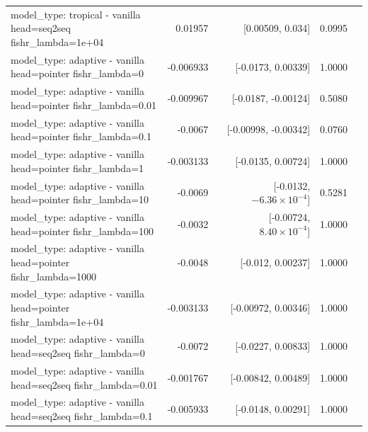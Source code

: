 \documentclass[10pt]{article}
\makeatletter
\newcommand{\stackcell}[1]{\begin{tabular}[t]{@{}l@{}}#1\end{tabular}}
\makeatother
\begin{document}
{\begin{longtable}{lrrrl}
\stackcell{model\_type: tropical - vanilla\\\footnotesize head=seq2seq fishr\_lambda=1e+04 } & 0.01957 & [0.00509, 0.034] & 0.0995 & \\
\stackcell{model\_type: adaptive - vanilla\\\footnotesize head=pointer fishr\_lambda=0 } & -0.006933 & [-0.0173, 0.00339] & 1.0000 & \\
\stackcell{model\_type: adaptive - vanilla\\\footnotesize head=pointer fishr\_lambda=0.01 } & -0.009967 & [-0.0187, -0.00124] & 0.5080 & \\
\stackcell{model\_type: adaptive - vanilla\\\footnotesize head=pointer fishr\_lambda=0.1 } & -0.0067 & [-0.00998, -0.00342] & 0.0760 & \\
\stackcell{model\_type: adaptive - vanilla\\\footnotesize head=pointer fishr\_lambda=1 } & -0.003133 & [-0.0135, 0.00724] & 1.0000 & \\
\stackcell{model\_type: adaptive - vanilla\\\footnotesize head=pointer fishr\_lambda=10 } & -0.0069 & [-0.0132, $-6.36\times10^{-4}$] & 0.5281 & \\
\stackcell{model\_type: adaptive - vanilla\\\footnotesize head=pointer fishr\_lambda=100 } & -0.0032 & [-0.00724, $8.40\times10^{-4}$] & 1.0000 & \\
\stackcell{model\_type: adaptive - vanilla\\\footnotesize head=pointer fishr\_lambda=1000 } & -0.0048 & [-0.012, 0.00237] & 1.0000 & \\
\stackcell{model\_type: adaptive - vanilla\\\footnotesize head=pointer fishr\_lambda=1e+04 } & -0.003133 & [-0.00972, 0.00346] & 1.0000 & \\
\stackcell{model\_type: adaptive - vanilla\\\footnotesize head=seq2seq fishr\_lambda=0 } & -0.0072 & [-0.0227, 0.00833] & 1.0000 & \\
\stackcell{model\_type: adaptive - vanilla\\\footnotesize head=seq2seq fishr\_lambda=0.01 } & -0.001767 & [-0.00842, 0.00489] & 1.0000 & \\
\stackcell{model\_type: adaptive - vanilla\\\footnotesize head=seq2seq fishr\_lambda=0.1 } & -0.005933 & [-0.0148, 0.00291] & 1.0000 & \\

\end{longtable}}
\end{document}

